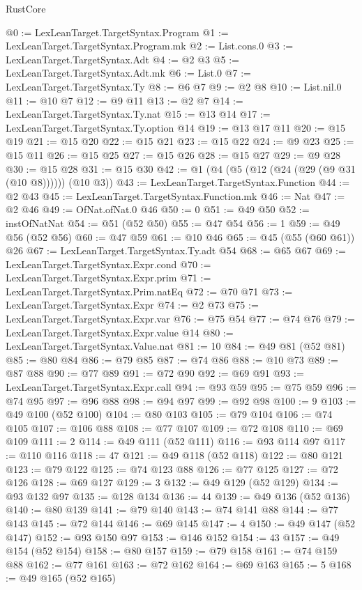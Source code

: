 \begin{lexlean}{RustCore}
\begin{coremodule}
@0 := LexLeanTarget.TargetSyntax.Program
@1 := LexLeanTarget.TargetSyntax.Program.mk
@2 := List.cons.{0}
@3 := LexLeanTarget.TargetSyntax.Adt
@4 := @2 @3
@5 := LexLeanTarget.TargetSyntax.Adt.mk
@6 := List.{0}
@7 := LexLeanTarget.TargetSyntax.Ty
@8 := @6 @7
@9 := @2 @8
@10 := List.nil.{0}
@11 := @10 @7
@12 := @9 @11
@13 := @2 @7
@14 := LexLeanTarget.TargetSyntax.Ty.nat
@15 := @13 @14
@17 := LexLeanTarget.TargetSyntax.Ty.option @14
@19 := @13 @17 @11
@20 := @15 @19
@21 := @15 @20
@22 := @15 @21
@23 := @15 @22
@24 := @9 @23
@25 := @15 @11
@26 := @15 @25
@27 := @15 @26
@28 := @15 @27
@29 := @9 @28
@30 := @15 @28
@31 := @15 @30
@42 := @1 (@4 (@5 (@12 (@24 (@29 (@9 @31 (@10 @8)))))) (@10 @3))
@43 := LexLeanTarget.TargetSyntax.Function
@44 := @2 @43
@45 := LexLeanTarget.TargetSyntax.Function.mk
@46 := Nat
@47 := @2 @46
@49 := OfNat.ofNat.{0} @46
@50 := 0
@51 := @49 @50
@52 := instOfNatNat
@54 := @51 (@52 @50)
@55 := @47 @54
@56 := 1
@59 := @49 @56 (@52 @56)
@60 := @47 @59
@61 := @10 @46
@65 := @45 (@55 (@60 @61)) @26
@67 := LexLeanTarget.TargetSyntax.Ty.adt @54
@68 := @65 @67
@69 := LexLeanTarget.TargetSyntax.Expr.cond
@70 := LexLeanTarget.TargetSyntax.Expr.prim
@71 := LexLeanTarget.TargetSyntax.Prim.natEq
@72 := @70 @71
@73 := LexLeanTarget.TargetSyntax.Expr
@74 := @2 @73
@75 := LexLeanTarget.TargetSyntax.Expr.var
@76 := @75 @54
@77 := @74 @76
@79 := LexLeanTarget.TargetSyntax.Expr.value @14
@80 := LexLeanTarget.TargetSyntax.Value.nat
@81 := 10
@84 := @49 @81 (@52 @81)
@85 := @80 @84
@86 := @79 @85
@87 := @74 @86
@88 := @10 @73
@89 := @87 @88
@90 := @77 @89
@91 := @72 @90
@92 := @69 @91
@93 := LexLeanTarget.TargetSyntax.Expr.call
@94 := @93 @59
@95 := @75 @59
@96 := @74 @95
@97 := @96 @88
@98 := @94 @97
@99 := @92 @98
@100 := 9
@103 := @49 @100 (@52 @100)
@104 := @80 @103
@105 := @79 @104
@106 := @74 @105
@107 := @106 @88
@108 := @77 @107
@109 := @72 @108
@110 := @69 @109
@111 := 2
@114 := @49 @111 (@52 @111)
@116 := @93 @114 @97
@117 := @110 @116
@118 := 47
@121 := @49 @118 (@52 @118)
@122 := @80 @121
@123 := @79 @122
@125 := @74 @123 @88
@126 := @77 @125
@127 := @72 @126
@128 := @69 @127
@129 := 3
@132 := @49 @129 (@52 @129)
@134 := @93 @132 @97
@135 := @128 @134
@136 := 44
@139 := @49 @136 (@52 @136)
@140 := @80 @139
@141 := @79 @140
@143 := @74 @141 @88
@144 := @77 @143
@145 := @72 @144
@146 := @69 @145
@147 := 4
@150 := @49 @147 (@52 @147)
@152 := @93 @150 @97
@153 := @146 @152
@154 := 43
@157 := @49 @154 (@52 @154)
@158 := @80 @157
@159 := @79 @158
@161 := @74 @159 @88
@162 := @77 @161
@163 := @72 @162
@164 := @69 @163
@165 := 5
@168 := @49 @165 (@52 @165)

\end{coremodule}
\end{lexlean}
